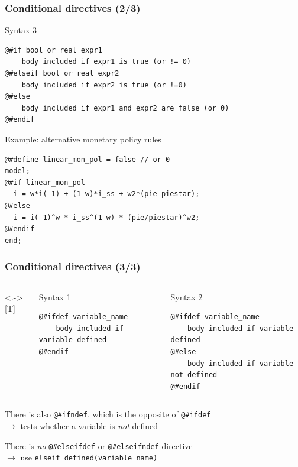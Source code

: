 \documentclass[handout,usepdftitle=false,xcolor=dvipsnames,aspectratio=169]{beamer}
\begin{document}
\begin{frame}[fragile]
  \frametitle{Conditional directives (2/3)}
  \begin{block}{Syntax 3}
    \scriptsize
    \begin{verbatim}
@#if bool_or_real_expr1
    body included if expr1 is true (or != 0)
@#elseif bool_or_real_expr2
    body included if expr2 is true (or !=0)
@#else
    body included if expr1 and expr2 are false (or 0)
@#endif
    \end{verbatim}
  \end{block}

  \begin{block}{Example: alternative monetary policy rules}
    \scriptsize
    \begin{verbatim}
@#define linear_mon_pol = false // or 0
model;
@#if linear_mon_pol
  i = w*i(-1) + (1-w)*i_ss + w2*(pie-piestar);
@#else
  i = i(-1)^w * i_ss^(1-w) * (pie/piestar)^w2;
@#endif
end;
\end{verbatim}
  \end{block}
\end{frame}

\begin{frame}[fragile]
  \frametitle{Conditional directives (3/3)}

  \begin{columns}<.->[T]
    \begin{block}{Syntax 1}
      \begin{verbatim}
@#ifdef variable_name
    body included if variable defined
@#endif
\end{verbatim}
    \end{block}

    \begin{block}{Syntax 2}
      \begin{verbatim}
@#ifdef variable_name
    body included if variable defined
@#else
    body included if variable not defined
@#endif
\end{verbatim}
    \end{block}
  \end{columns}

  \bigskip
  \begin{witemize}
    \item There is also \verb+@#ifndef+, which is the opposite of \verb+@#ifdef+ \\
    $\rightarrow$ tests whether a variable is \emph{not} defined
    \item There is
    \emph{no} \verb+@#elseifdef+ or \verb+@#elseifndef+ directive\\
    $\rightarrow$ use \texttt{elseif defined(variable\_name)}
  \end{witemize}
\end{frame}
\end{document}
